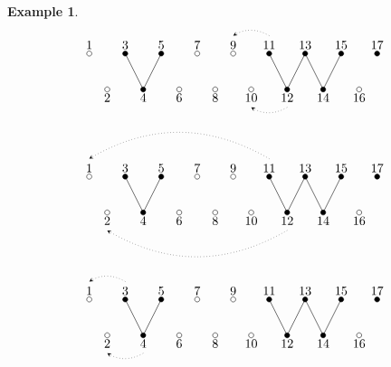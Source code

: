 \documentclass{amsart}
\newtheorem{example}[theorem]{Example}
\numberwithin{equation}{section}
\begin{document}
\begin{example}
\[      \]
      \[
        \begin{tikzpicture}
          \draw[dotted,-stealth] (5.5,1.5) to[out=150,in=30] (4.5,1.5);
          \draw[dotted,-stealth] (6,-0.5) to[out=210,in=-30] (5,-0.5);
          \foreach \i in {3,5,11,13,15,17}{
            \draw[fill=black] (0.5*\i,1) circle (2pt);
            \node[above] at (0.5*\i,1) {\i};}
          \foreach \i in {1,7,9}{
            \draw[fill=white] (0.5*\i,1) circle (2pt);
            \node[above] at (0.5*\i,1) {\i};}
          \foreach \i in {4,12,14}{
            \draw[fill=black] (0.5*\i,0) circle (2pt);
            \draw (0.5*\i,0) -- (0.5*\i-0.5,1);
            \draw (0.5*\i,0) -- (0.5*\i+0.5,1);
            \node[below] at (0.5*\i,0) {\i};}
          \foreach \i in {2,6,8,10,16}{
            \draw[fill=white] (0.5*\i,0) circle (2pt);
            \node[below] at (0.5*\i,0) {\i};}
        \end{tikzpicture}
      \]
      \[
        \begin{tikzpicture}
          \draw[dotted,-stealth] (5.5,1.5) to[out=150,in=30] (0.5,1.5);
          \draw[dotted,-stealth] (6,-0.5) to[out=210,in=-30] (1,-0.5);
          \foreach \i in {3,5,11,13,15,17}{
            \draw[fill=black] (0.5*\i,1) circle (2pt);
            \node[above] at (0.5*\i,1) {\i};}
          \foreach \i in {1,7,9}{
            \draw[fill=white] (0.5*\i,1) circle (2pt);
            \node[above] at (0.5*\i,1) {\i};}
          \foreach \i in {4,12,14}{
            \draw[fill=black] (0.5*\i,0) circle (2pt);
            \draw (0.5*\i,0) -- (0.5*\i-0.5,1);
            \draw (0.5*\i,0) -- (0.5*\i+0.5,1);
            \node[below] at (0.5*\i,0) {\i};}
          \foreach \i in {2,6,8,10,16}{
            \draw[fill=white] (0.5*\i,0) circle (2pt);
            \node[below] at (0.5*\i,0) {\i};}
        \end{tikzpicture}
      \]
      \[
        \begin{tikzpicture}
          \draw[dotted,-stealth] (1.5,1.5) to[out=150,in=30] (0.5,1.5);
          \draw[dotted,-stealth] (2,-0.5) to[out=210,in=-30] (1,-0.5);
          \foreach \i in {3,5,11,13,15,17}{
            \draw[fill=black] (0.5*\i,1) circle (2pt);
            \node[above] at (0.5*\i,1) {\i};}
          \foreach \i in {1,7,9}{
            \draw[fill=white] (0.5*\i,1) circle (2pt);
            \node[above] at (0.5*\i,1) {\i};}
          \foreach \i in {4,12,14}{
            \draw[fill=black] (0.5*\i,0) circle (2pt);
            \draw (0.5*\i,0) -- (0.5*\i-0.5,1);
            \draw (0.5*\i,0) -- (0.5*\i+0.5,1);
            \node[below] at (0.5*\i,0) {\i};}
          \foreach \i in {2,6,8,10,16}{
            \draw[fill=white] (0.5*\i,0) circle (2pt);
            \node[below] at (0.5*\i,0) {\i};}
        \end{tikzpicture}
      \]

    \end{example}
\end{document}
